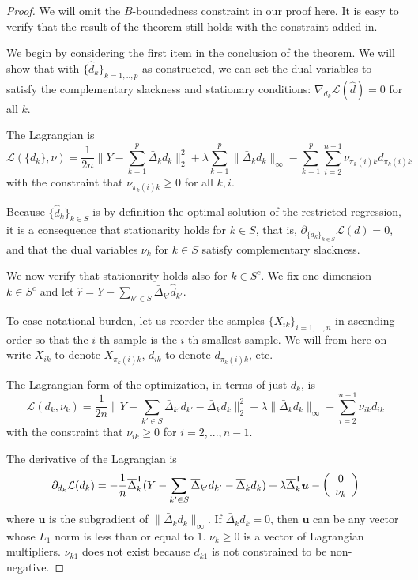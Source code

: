 \documentclass[12pt,pdftex,aos,noinfoline,addressasfootnote]{imsart}
\begin{document}
\begin{proof} 
We will omit the $B$-boundedness constraint in our proof here. It is easy to verify that the result of the theorem still holds with the constraint added in. 



We begin by considering the first item in the conclusion of the theorem.
We will show that with $\{\hat{d}_k\}_{k=1,..,p}$ as constructed, we
can set the dual variables to satisfy the 
complementary slackness and stationary conditions: $\nabla_{d_k} \mathcal{L}(\hat{d})  = 0$ for all $k$. 

The Lagrangian is
\begin{equation}
\label{eqn:full_lagrange}
\mathcal{L}( \{ d_k \}, \nu) = 
  \frac{1}{2n} \Big\| 
    Y - \sum_{k=1}^p  \bar{\Delta}_k d_k  \Big\|_2^2 + 
    \lambda \sum_{k=1}^p \| \bar{\Delta}_k d_k \|_\infty -
    \sum_{k=1}^p \sum_{i=2}^{n-1} \nu_{\pi_k(i)k} d_{\pi_k(i)k} 
\end{equation}
with the constraint that $\nu_{\pi_k(i)k} \geq 0$ for all $k,i$.

Because $\{\hat{d}_k\}_{k \in S}$ is by definition the optimal solution of the restricted regression, it is a consequence that stationarity holds for $k \in S$, that is, $\partial_{ \{ d_k \}_{k \in S} } \mathcal{L}(d) = 0$, and that the dual variables $\nu_k$ for $k \in S$ satisfy complementary slackness.

We now verify that stationarity holds also for $k \in S^c$. We fix one dimension $k \in S^c$ and let $\hat{r} = Y - \sum_{k' \in S} \bar{\Delta}_{k'} \hat{d}_{k'}$. 

To ease notational burden, let us reorder the samples $\{X_{ik}\}_{i=1,...,n}$ in ascending order so that the $i$-th sample is the $i$-th smallest sample. We will from here on write $X_{ik}$ to denote $X_{\pi_k(i)k}$, $d_{ik}$ to denote $d_{\pi_k(i)k}$, etc.

The Lagrangian form of the optimization, in terms of just $d_k$, is
\[
\mathcal{L}(d_k, \nu_k) =
  \frac{1}{2n} \big\| Y - \sum_{k' \in S} \bar{\Delta}_{k'} d_{k'} 
  -  \bar{\Delta}_k d_k \big\|_2^2 
   + \lambda \| \bar{\Delta}_k d_k\|_\infty
  - \sum_{i=2}^{n-1} \nu_{ik} d_{ik}
\]
with the constraint that $\nu_{ik} \geq 0$ for $i=2,...,n-1$. 

The derivative of the Lagrangian is
\begin{align*}
\partial_{d_k} \mathcal{L}(d_k) =  -\frac{1}{n} \overline{\Delta}_k^{\mathsf{T}} ( Y - \sum_{k'\in S} \overline{\Delta}_{k'} d_{k'}  - \overline{\Delta}_k d_k )
        + \lambda \overline{\Delta}_k^{\mathsf{T}} \mbox{\boldmath $u$}
      - \left( \begin{array}{c} 0 \\ \nu_k \end{array} \right)
\end{align*}
where $\mathbf{u}$ is the subgradient of $\| \bar{\Delta}_k d_k \|_\infty$. If $\bar{\Delta}_k d_k = 0$, then $\mathbf{u}$ can be any vector whose $L_1$ norm is less than or equal to $1$. $\nu_k \geq 0$ is a vector of Lagrangian multipliers. $\nu_{k1}$ does not exist because $d_{k1}$ is not constrained to be non-negative.


\end{proof}
\end{document}

